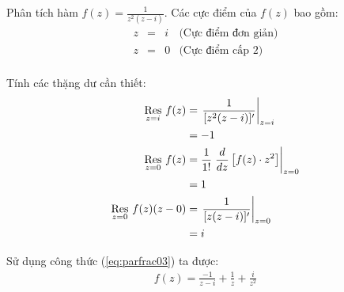 	\begin{example}
		Phân tích hàm \(f(z) = \frac{1}{z^2(z-i)}\). Các cực điểm của \(f(z)\) bao gồm:
		\[
			\begin{array}{cccc}
				z &=& i & \text{(Cực điểm đơn giản)}\\
				z &=& 0 & \text{(Cực điểm cấp 2)}\\
			\end{array}
		\] \par
		Tính các thặng dư cần thiết:
		\begin{align*}
			\Res{f(z)}{z=i} &= \left.\frac{1}{[z^2(z-i)]'}\right\vert_{z=i} \\&= -1\\
			\Res{f(z)}{z=0} &= \frac{1}{1!} \left.\frac{d}{dz}\left[f(z)\cdot z^2\right]\right\vert_{z=0}\\&= 1\\
			\Res{f(z)(z-0)}{z=0} &= \left.\frac{1}{[z(z-i)]'}\right\vert_{z=0} \\&= i
		\end{align*}
		\par	Sử dụng công thức (\ref{eq:parfrac03}) ta được:
		\begin{align*}
			f(z) = \frac{-1}{z-i} + \frac{1}{z} + \frac{i}{z^2}
		\end{align*}
	\end{example}
